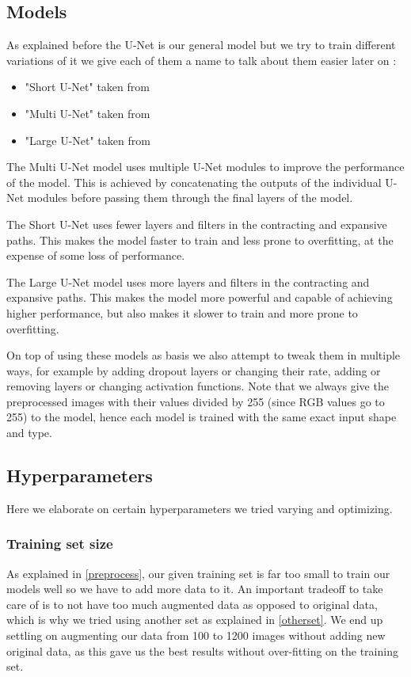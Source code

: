 \documentclass[10pt,conference,compsocconf]{IEEEtran}
\begin{document}
\subsection{Models}
\label{models}
As explained before the U-Net is our general model but we try to train different variations of it we give each of them a name to talk about them easier later on :
\begin{itemize}
\item "Short U-Net" taken from \cite{short-unet}
\item "Multi U-Net" taken from \cite{multi-unet}
\item "Large U-Net" taken from \cite{large-unet}
\end{itemize}
The Multi U-Net model uses multiple U-Net modules to improve the performance of the model. This is achieved by concatenating the outputs of the individual U-Net modules before passing them through the final layers of the model.

The Short U-Net uses fewer layers and filters in the contracting and expansive paths. This makes the model faster to train and less prone to overfitting, at the expense of some loss of performance.

The Large U-Net model uses more layers and filters in the contracting and expansive paths. This makes the model more powerful and capable of achieving higher performance, but also makes it slower to train and more prone to overfitting.

On top of using these models as basis we also attempt to tweak them in multiple ways, for example by adding dropout layers or changing their rate, adding or removing layers or changing activation functions.
Note that we always give the preprocessed images with their values divided by 255 (since RGB values go to 255) to the model, hence each model is trained with the same exact input shape and type.

\subsection{Hyperparameters}
Here we elaborate on certain hyperparameters we tried varying and optimizing.
\subsubsection{Training set size}
As explained in \ref{preprocess}, our given training set is far too small to train our models well so we have to add more data to it. An important tradeoff to take care of is to not have too much augmented data as opposed to original data, which is why we tried using another set as explained in \ref{otherset}. We end up settling on augmenting our data from 100 to 1200 images without adding new original data, as this gave us the best results without over-fitting on the training set.
\end{document}

